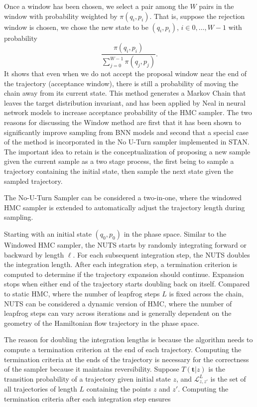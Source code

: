 \documentclass[12pt]{report}
\begin{document}
Once a window has been chosen, we select a pair among the $W$ pairs in the window with probability weighted by $\pi(q_i,p_i)$. That is, suppose the rejection window is chosen, we chose the new state to be $(q_i,p_i)$, $i \in {0,\dots,W-1}$ with probability 
\[ \frac{\pi(q_i,p_i)}{\sum_{j=0}^{W-1} \pi(q_j,p_j)}. \]
It shows that even when we do not accept the proposal window near the end of the trajectory (acceptance window), there is still a probability of moving the chain away from its current state. This method generates a Markov Chain that leaves the target distribution invariant, and has been applied by Neal in neural network models to increase acceptance probability of the HMC sampler\cite{neal1992improved}. The two reasons for discussing the Window method are first that it has been shown to
significantly improve sampling from BNN models and second that a special case of
the method is incorporated in the No U-Turn sampler implemented in STAN. The important idea to retain is the conceptualization of proposing a new sample given the current sample as a two stage process, the first being to sample a trajectory containing the initial state, then sample the next state given the sampled trajectory.


The No-U-Turn Sampler \cite{hoffman2014no} can be considered a two-in-one, where the windowed HMC sampler is extended to automatically adjust the trajectory length during sampling. 

Starting with an initial state $(q_0,p_0)$ in the phase space. Similar to the Windowed HMC sampler, the NUTS starts by randomly integrating forward or backward by length $\ell$. For each subsequent integration step, the NUTS doubles the integration length. After each integration step, a termination criterion is computed to determine if the trajectory expansion should continue. Expansion stops when either end of the trajectory starts doubling back on itself. Compared to static HMC, where the number of leapfrog steps $L$ is fixed across the chain, NUTS can be considered a dynamic version of HMC, where the number of leapfrog steps can vary across iterations and is generally dependent on the geometry of the Hamiltonian flow trajectory in the phase space. 

The reason for doubling the integration lengths is because the algorithm needs to compute a termination criterion at the end of each trajectory. Computing the termination criteria at the ends of the trajectory is necessary for the correctness of the sampler because it maintains reversibility. Suppose $T(\mathbf{t}|z) $ is the transition probability of a trajectory given initial state $z$, and $\mathcal{L}^L_{z,z'}$ is the set of all trajectories of length $L$ containing the points $z$ and $z'$. Computing the termination criteria after each integration step ensures
\end{document}
